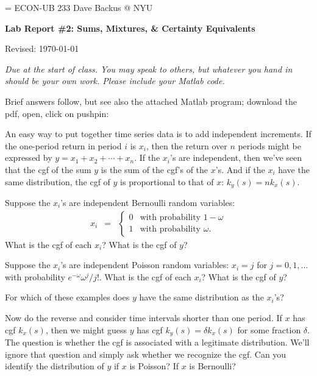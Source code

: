 \documentclass[11pt]{exam}
\begin{document}
\parskip=\bigskipamount
\parindent=0.0in
\thispagestyle{empty}
{\large ECON-UB 233 \hfill Dave Backus @ NYU}

\bigskip\bigskip
\centerline{\Large \bf Lab Report \#2: Sums, Mixtures, \& Certainty Equivalents}
\centerline{Revised: \today}

\bigskip
{\it Due at the start of class.
You may speak to others, but whatever you hand in should be your own work.
Please include your Matlab code.}

\begin{questions}

\begin{solution}
Brief answers follow,
but see also the attached Matlab program;
download the pdf, open, click on pushpin:
\end{solution}

An easy way to put together time series data is to add independent increments.
If the one-period return in period $i$ is $x_i$,
then the return over $n$ periods might be expressed by
$y = x_1 + x_2 + \cdots + x_n$.
If the $x_i$'s are independent,
then we've seen that the cgf of the sum $y$ is the sum of the cgf's of the $x$'s.
And if the $x_i$ have the same distribution,
the cgf of $y$ is proportional to that of $x$:  $k_y(s) = n k_x(s)$.
%
\begin{parts}
\item Suppose the $x_i$'s are independent Bernoulli random variables:
\begin{eqnarray*}
    x_i &=& \left\{
            \begin{array}{ll}
            0 & \mbox{with probability } 1-\omega \\
            1 & \mbox{with probability } \omega .
            \end{array}
            \right.
\end{eqnarray*}
What is the cgf of each $x_i$?  What is the cgf of $y$?

\item Suppose the $x_i$'s are independent Poisson random variables:
$ x_i = j $ for $j = 0,1,\ldots $ with probability $ e^{-\omega} \omega^j/j! $.
What is the cgf of each $x_i$?  What is the cgf of $y$?

\item For which of these examples does $y$ have the same distribution
as the $x_i$'s?

\item Now do the reverse and consider time intervals shorter than one period.
If $x$ has cgf $k_x(s)$,
then we might guess $y$ has cgf $ k_y (s) = \delta k_x(s)$ for some fraction $\delta$.
The question is whether the cgf is associated with a legitimate distribution.
We'll ignore that question and simply ask whether we recognize the cgf.
Can you identify the distribution of $y$ if $x$ is Poisson?
If $x$ is Bernoulli?
\end{parts}


\end{questions}
\end{document}
